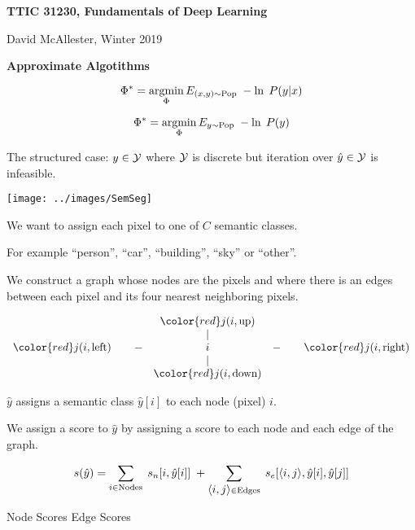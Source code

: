 




{\Huge

  \centerline{\bf TTIC 31230, Fundamentals of Deep Learning}
  \bigskip
  \centerline{David McAllester, Winter 2019}
  \vfill
  \vfill
  \centerline{\bf Approximate Algotithms}
  \vfill
\vfill
\vfill
\vfill


\vfill
{\color{red}
$$\Phi^* = \operatorname*{argmin}_\Phi E_{(x,y) \sim \mathrm{Pop}}\;-\ln \;P(y|x)$$

\vfill
$$\Phi^* = \operatorname*{argmin}_\Phi E_{y \sim \mathrm{Pop}}\;-\ln \;P(y)$$
}

{\color{red} The structured case:} $y \in {\cal Y}$ where ${\cal Y}$ is discrete but {\color{red} iteration over $\hat{y} \in {\cal Y}$ is infeasible}.
\centerline{\texttt{[image: ../images/SemSeg]}}

\vfill
We want to assign each pixel to one of $C$ semantic classes.

\vfill
For example ``person'', ``car'', ``building'', ``sky'' or ``other''.


We construct a graph whose nodes are the pixels and where there is an edges between each pixel and its four nearest neighboring pixels.

\vfill
$$\begin{array}{ccccc}
 & & {\color{red} j(i,\mathrm{up})} \\
 & & | \\
 {\color{red} j(i,\mathrm{left})}\;\;\;\; & -& i & -& \;\;\;\;{\color{red} j(i,\mathrm{right})} \\
 & & | \\
 & & {\color{red} j(i,\mathrm{down})}
 \end{array}$$


$\hat{y} $ assigns a semantic class $\hat{y}[i]$ to each node (pixel) $i$.

\vfill
We assign a score to $\hat{y}$ by assigning a score to each node and each edge of the graph.

{\color{red} $$s(\hat{y}) = \sum_{i \in \mathrm{Nodes}}\; s_n[i,\hat{y}[i]]\; + \sum_{{\mbox{$\langle i,j\rangle$}} \in \mathrm{Edges}}\;s_e[{\mbox{$\langle i,j\rangle$}},\hat{y}[i],\hat{y}[j]]$$}
\centerline{Node Scores \hspace{6em}Edge Scores \hspace{3em}~}

}
